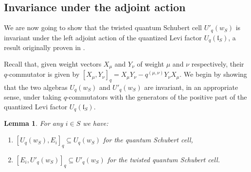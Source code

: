 \documentclass[a4paper, 12pt, reqno, english]{amsart}
\numberwithin{equation}{section}
\numberwithin{figure}{section}
\theoremstyle{plain}
\theoremstyle{plain}
\theoremstyle{plain}
\theoremstyle{plain}
\newtheorem{lemma}[theorem]{Lemma}
\theoremstyle{plain}
\theoremstyle{definition}
\theoremstyle{definition}
\theoremstyle{definition}
\theoremstyle{remark}
\theoremstyle{definition}
\theoremstyle{definition}
\newcommand{\UqlS}{U_q(\mathfrak{l}_S)}
\newcommand{\schub}{U_q}
\newcommand{\tschub}{U'_q}
\begin{document}
\subsection{Invariance under the adjoint action}

We are now going to show that the twisted quantum Schubert cell $\tschub(w_S)$ is invariant under the left adjoint action of the quantized Levi factor $\UqlS$, a result originally proven in \cite[Theorem 5.21]{zwicknagl}.

Recall that, given weight vectors $X_\mu$ and $Y_\nu$ of weight $\mu$ and $\nu$ respectively, their $q$-commutator is given by $[X_\mu, Y_\nu]_q = X_\mu Y_\nu - q^{(\mu, \nu)} Y_\nu X_\mu$.
We begin by showing that the two algebras $\schub(w_S)$ and $\tschub(w_S)$ are invariant, in an appropriate sense, under taking $q$-commutators with the generators of the positive part of the quantized Levi factor $\UqlS$.

\begin{lemma}
\label{lem:qcommutator-schubert}
For any $i \in S$ we have:
\begin{enumerate}
\item $[\schub(w_S), E_i]_q \subseteq \schub(w_S)$ for the quantum Schubert cell,
\item $[E_i, \tschub(w_S)]_q \subseteq \tschub(w_S)$ for the twisted quantum Schubert cell.
\end{enumerate}
\end{lemma}
\end{document}
